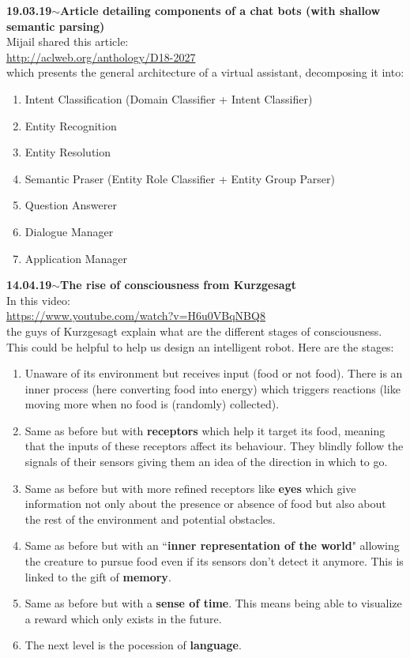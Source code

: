 \documentclass[11pt,a4paper]{article}
\newenvironment{loggentry}[2]%
{\noindent\textbf{#1}\hspace{1cm}$\mathbf{\sim}$\text{ }\textbf{#2}\\}{\vspace{0.5cm}}
\begin{document}
\begin{loggentry}{19.03.19}{Article detailing components of a chat bots (with shallow semantic parsing)}

Mijail shared this article:\\
\url{http://aclweb.org/anthology/D18-2027}\\
which presents the general architecture of a virtual assistant, decomposing it into:
\begin{enumerate}
\item Intent Classification (Domain Classifier + Intent Classifier)
\item Entity Recognition
\item Entity Resolution
\item Semantic Praser (Entity Role Classifier + Entity Group Parser)
\item Question Answerer
\item Dialogue Manager
\item Application Manager
\end{enumerate}

\end{loggentry}


\begin{loggentry}{14.04.19}{The rise of consciousness from Kurzgesagt}

In this video:\\
\url{https://www.youtube.com/watch?v=H6u0VBqNBQ8}\\
the guys of Kurzgesagt explain what are the different stages of consciousness. This could be helpful to help us design an intelligent robot. Here are the stages:\\
\begin{enumerate}
\item Unaware of its environment but receives input (food or not food). There is an inner process (here converting food into energy) which triggers reactions (like moving more when no food is (randomly) collected).
\item Same as before but with \textbf{receptors} which help it target its food, meaning that the inputs of these receptors affect its behaviour. They blindly follow the signals of their sensors giving them an idea of the direction in which to go.
\item Same as before but with more refined receptors like \textbf{eyes} which give information not only about the presence or absence of food but also about the rest of the environment and potential obstacles.
\item Same as before but with an ``\textbf{inner representation of the world}" allowing the creature to pursue food even if its sensors don't detect it anymore. This is linked to the gift of \textbf{memory}.
\item Same as before but with a \textbf{sense of time}. This means being able to visualize a reward which only exists in the future.
\item The next level is the pocession of \textbf{language}.
\end{enumerate}

\end{loggentry}
\end{document}
